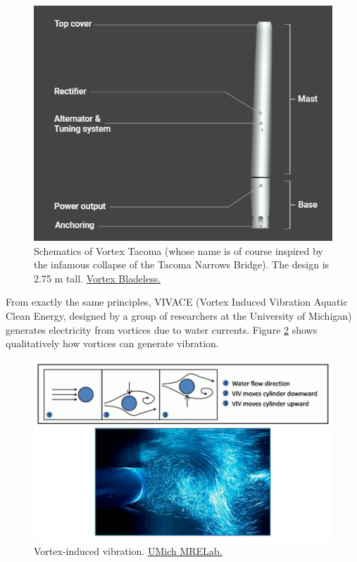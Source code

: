 \documentclass[11pt]{article}
\begin{document}
\begin{figure}[!htb]
	\centering
	\includegraphics[scale=0.55]{vortex1}
	\caption{Schematics of Vortex Tacoma (whose name is of course inspired by the infamous collapse of the Tacoma Narrows Bridge). The design is 2.75 m tall. \href{https://vortexbladeless.com/}{Vortex Bladeless.}}
	\label{fig:vortex1}
\end{figure}

From exactly the same principles, VIVACE (Vortex Induced Vibration Aquatic Clean Energy, designed by a group of researchers at the University of Michigan) generates electricity from vortices due to water currents. Figure \ref{fig:vortex2} shows qualitatively how vortices can generate vibration. \\

\begin{figure}[!htb]
	\centering
	\includegraphics[scale=0.65]{vortex2}
	\caption{Vortex-induced vibration. \href{http://www.umich.edu/~mrel/}{UMich MRELab.}}
	\label{fig:vortex2}
\end{figure}
\end{document}
